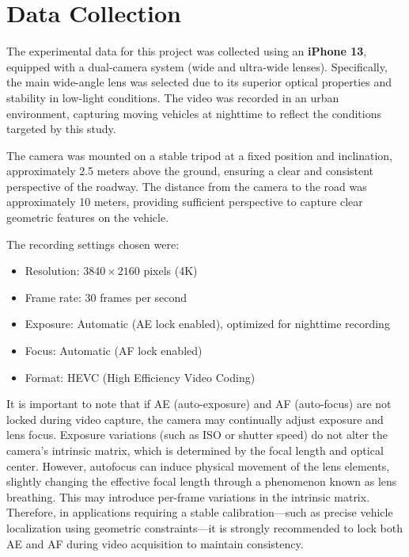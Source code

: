 \section{Data Collection}
The experimental data for this project was collected using an \textbf{iPhone 13}, equipped with a dual-camera system (wide and ultra-wide lenses). Specifically, the main wide-angle lens was selected due to its superior optical properties and stability in low-light conditions. The video was recorded in an urban environment, capturing moving vehicles at nighttime to reflect the conditions targeted by this study.

The camera was mounted on a stable tripod at a fixed position and inclination, approximately 2.5 meters above the ground, ensuring a clear and consistent perspective of the roadway. The distance from the camera to the road was approximately 10 meters, providing sufficient perspective to capture clear geometric features on the vehicle.

The recording settings chosen were:
\begin{itemize}
    \item Resolution: $3840 \times 2160$ pixels (4K)
    \item Frame rate: 30 frames per second
    \item Exposure: Automatic (AE lock enabled), optimized for nighttime recording
    \item Focus: Automatic (AF lock enabled)
    \item Format: HEVC (High Efficiency Video Coding)
\end{itemize}

It is important to note that if AE (auto-exposure) and AF (auto-focus) are not locked during video capture, the camera may continually adjust exposure and lens focus. Exposure variations (such as ISO or shutter speed) do not alter the camera's intrinsic matrix, which is determined by the focal length and optical center. However, autofocus can induce physical movement of the lens elements, slightly changing the effective focal length through a phenomenon known as lens breathing. This may introduce per-frame variations in the intrinsic matrix. Therefore, in applications requiring a stable calibration—such as precise vehicle localization using geometric constraints—it is strongly recommended to lock both AE and AF during video acquisition to maintain consistency.

